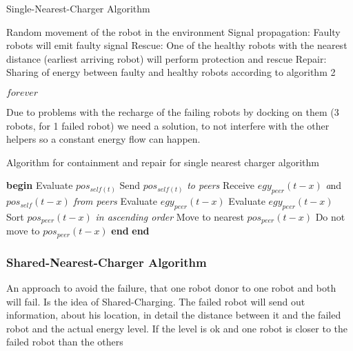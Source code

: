 \documentclass[
	a4paper,
	article,
	pagesize,
	pdftex,
	12pt,
	english,
	fleqn,
	final,
	]{scrartcl}
\begin{document}
\begin{algorithm}
	\caption{Single-Nearest-Charger Algorithm}
	\begin{algorithmic}[1]
		\Repeat 
		\State \parbox[t]{0.8\textwidth}{Random movement of the robot in the environment Signal propagation: Faulty robots will emit faulty signal Rescue: One of the healthy robots with the nearest distance (earliest arriving robot) will perform protection and rescue Repair: Sharing of energy between faulty and healthy robots according to algorithm 2} 
		\Until $forever$
		\EndProcedure
	\end{algorithmic}
\end{algorithm}

Due to problems with the recharge of the failing robots by docking on them (3 robots, 
for 1 failed robot) we need a solution, to not interfere with the other helpers so a constant energy flow can happen.

\begin{algorithm}
	\caption{Algorithm for containment and repair for single nearest charger algorithm}
	\begin{algorithmic}[1]
		\Procedure{}{}
		\State \textbf{begin}
		\State Evaluate $pos_{self(t)}$
		\State Send $pos_{self(t)}$ \textit {to peers}
		\State Receive $egy_{peer}(t-x)$ \textit and $pos_{self}(t-x)$ \textit {from peers}
		\State Evaluate $egy_{peer}(t-x)$
		\State Evaluate $egy_{peer}(t-x)$
		\State Sort $pos_{peer}(t-x)$ \textit {in ascending order}
		\State Move to nearest $pos_{peer}(t-x)$
		\Else
		\State Do not move to $pos_{peer}(t-x)$
		\EndIf \textbf{end}
		\EndFor \textbf{end}
		\EndProcedure
	\end{algorithmic}
\end{algorithm}
\clearpage
\subsubsection{Shared-Nearest-Charger Algorithm}
An approach to avoid the failure, that one robot donor to one robot and both will fail. Is the idea of Shared-Charging. The failed robot will send out information, about his location, in detail the distance between it and the failed robot and the actual energy level. If the level is ok and one robot is closer to the failed robot than the others
\end{document}
